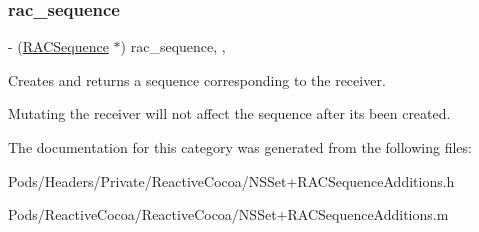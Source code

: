 \subsubsection{\texorpdfstring{rac\+\_\+sequence}{rac\_sequence}}
{\footnotesize\ttfamily -\/ (\mbox{\hyperlink{interface_r_a_c_sequence}{R\+A\+C\+Sequence}} $\ast$) rac\+\_\+sequence\hspace{0.3cm}{\ttfamily [read]}, {\ttfamily [nonatomic]}, {\ttfamily [copy]}}

Creates and returns a sequence corresponding to the receiver.

Mutating the receiver will not affect the sequence after it\textquotesingle{}s been created. 

The documentation for this category was generated from the following files\+:\begin{DoxyCompactItemize}
\item 
Pods/\+Headers/\+Private/\+Reactive\+Cocoa/N\+S\+Set+\+R\+A\+C\+Sequence\+Additions.\+h\item 
Pods/\+Reactive\+Cocoa/\+Reactive\+Cocoa/N\+S\+Set+\+R\+A\+C\+Sequence\+Additions.\+m\end{DoxyCompactItemize}
